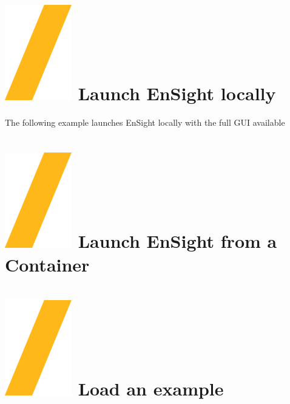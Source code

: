 \documentclass[9pt,landscape]{article}
\begin{document}
\begin{multicols}{3}
\setlength{\premulticols}{1pt}
\setlength{\postmulticols}{1pt}
\setlength{\multicolsep}{1pt}
\setlength{\columnsep}{2pt}


\section{\includegraphics[height=\fontcharht\font`\S]{slash.png} Launch EnSight locally}


The following example launches EnSight locally with the full GUI available



\section{\includegraphics[height=\fontcharht\font`\S]{slash.png} Launch EnSight from a Container}




\section{\includegraphics[height=\fontcharht\font`\S]{slash.png} Load an example}


\end{multicols}
\end{document}
